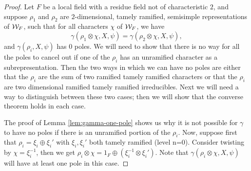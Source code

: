 \begin{proof}
  Let $F$ be a local field with a residue field not of characteristic $2$, and suppose $\rho_1$ and $\rho_2$ are $2$-dimensional, tamely ramified, semisimple representations of $\mathcal{W}_F$, such that for all characters $\chi$ of $\mathcal{W}_F$, we have
  \[\gamma(\rho_1 \otimes \chi,X,\psi) = \gamma(\rho_2 \otimes \chi,X,\psi),\]
  and $\gamma(\rho_i,X,\psi)$ has $0$ poles.
  We will need to show that there is no way for all the poles to cancel out if one of the $\rho_i$ has an unramified character as a subrepresentation.
  Then the two ways in which we can have no poles are either that the $\rho_i$ are the sum of two ramified tamely ramified characters or that the $\rho_i$ are two dimensional ramified tamely ramified irreducibles.
  Next we will need a way to distinguish between these two cases; then we will show that the converse theorem holds in each case.

  The proof of Lemma \ref{lem:gamma-one-pole} shows us why it is not possible for $\gamma$ to have no poles if there is an unramified portion of the $\rho_i$.
  Now, suppose first that $\rho_i = \xi_i \oplus \xi_i'$ with $\xi_i, \xi_i'$ both tamely ramified (level n=0).
  Consider twisting by $\chi = \xi_i^{-1}$, then we get $\rho_i \otimes \chi = 1_F \oplus (\xi_i^{-1} \otimes \xi_i')$.
  Note that $\gamma(\rho_i \otimes \chi,X,\psi)$ will have at least one pole in this case.


\end{proof}
